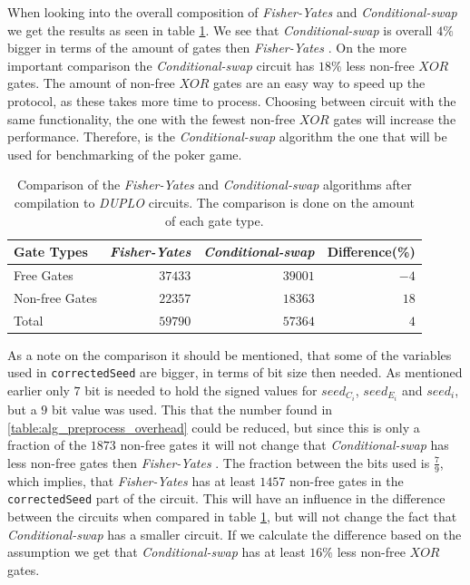 \documentclass[twoside,11pt,openright]{report}
\newcommand{\FY}{\textit{Fisher-Yates} }
\newcommand{\CS}{\textit{Conditional-swap} }
\newcommand{\DUPLO}{\textit{DUPLO} }
\begin{document}
When looking into the overall composition of \FY and \CS we get the results as seen in table \ref{table:circuit_comp}. We see that \CS is overall $4\%$ bigger in terms of the amount of gates then \FY. On the more important comparison the \CS circuit has $18\%$ less non-free $XOR$ gates. The amount of non-free $XOR$ gates are an easy way to speed up the protocol, as these takes more time to process. Choosing between circuit with the same functionality, the one with the fewest non-free $XOR$ gates will increase the performance. Therefore, is the \CS algorithm the one that will be used for benchmarking of the poker game.

\begin{table}[t]
\centering
\begin{tabular}{l || r | r | r}
Gate Types     & \FY     & \CS     & Difference(\%) \\
\hline
Free Gates     & $37433$ & $39001$ & $-4$   \\
Non-free Gates & $22357$ & $18363$ & $18$   \\
\hline
Total          & $59790$ & $57364$ &  $4$
\end{tabular}
\caption{Comparison of the \FY and \CS algorithms after compilation to \DUPLO circuits. The comparison is done on the amount of each gate type.}
\label{table:circuit_comp}
\end{table}

\bigskip

As a note on the comparison it should be mentioned, that some of the variables used in \verb|correctedSeed| are bigger, in terms of bit size then needed. As mentioned earlier only $7$ bit is needed to hold the signed values for $seed_{C_i}$, $seed_{E_i}$ and $seed_i$, but a $9$ bit value was used. This that the number found in \ref{table:alg_preprocess_overhead} could be reduced, but since this is only a fraction of  the $1873$ non-free gates it will not change that \CS has less non-free gates then \FY. The fraction between the bits used is $\frac{7}{9}$, which implies, that \FY has at least $1457$ non-free gates in the \verb|correctedSeed| part of the circuit. This will have an influence in the difference between the circuits when compared in table \ref{table:circuit_comp}, but will not change the fact that \CS has a smaller circuit. If we calculate the difference based on the assumption we get that \CS has at least $16\%$ less non-free $XOR$ gates.

\bigskip
\end{document}
